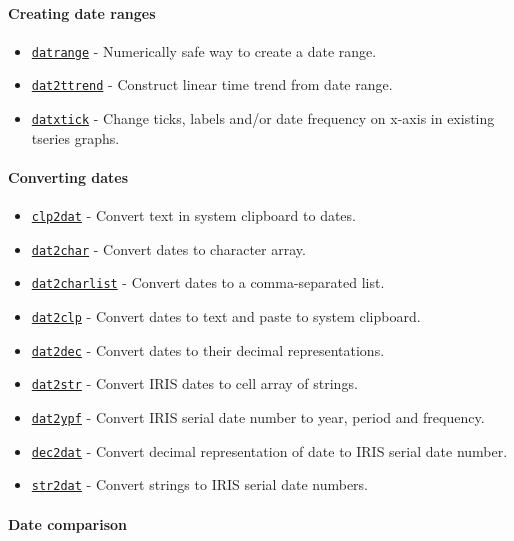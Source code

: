 \paragraph{Creating date ranges}

\begin{itemize}
\itemsep1pt\parskip0pt
\item
  \href{dates/datrange}{\texttt{datrange}} - Numerically safe way to
  create a date range.
\item
  \href{dates/dat2ttrend}{\texttt{dat2ttrend}} - Construct linear time
  trend from date range.
\item
  \href{dates/datxtick}{\texttt{datxtick}} - Change ticks, labels and/or
  date frequency on x-axis in existing tseries graphs.
\end{itemize}

\paragraph{Converting dates}

\begin{itemize}
\itemsep1pt\parskip0pt
\item
  \href{dates/clp2dat}{\texttt{clp2dat}} - Convert text in system
  clipboard to dates.
\item
  \href{dates/dat2char}{\texttt{dat2char}} - Convert dates to character
  array.
\item
  \href{dates/dat2charlist}{\texttt{dat2charlist}} - Convert dates to a
  comma-separated list.
\item
  \href{dates/dat2clp}{\texttt{dat2clp}} - Convert dates to text and
  paste to system clipboard.
\item
  \href{dates/dat2dec}{\texttt{dat2dec}} - Convert dates to their
  decimal representations.
\item
  \href{dates/dat2str}{\texttt{dat2str}} - Convert IRIS dates to cell
  array of strings.
\item
  \href{dates/dat2ypf}{\texttt{dat2ypf}} - Convert IRIS serial date
  number to year, period and frequency.
\item
  \href{dates/dec2dat}{\texttt{dec2dat}} - Convert decimal
  representation of date to IRIS serial date number.
\item
  \href{dates/str2dat}{\texttt{str2dat}} - Convert strings to IRIS
  serial date numbers.
\end{itemize}

\paragraph{Date comparison}

